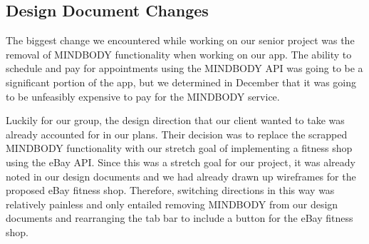 \subsection{Design Document Changes}
The biggest change we encountered while working on our senior project was the removal of MINDBODY functionality when working on our app. The ability to schedule and pay for appointments using the MINDBODY API was going to be a significant portion of the app, but we determined in December that it was going to be unfeasibly expensive to pay for the MINDBODY service.

Luckily for our group, the design direction that our client wanted to take was already accounted for in our plans. Their decision was to replace the scrapped MINDBODY functionality with our stretch goal of implementing a fitness shop using the eBay API. Since this was a stretch goal for our project, it was already noted in our design documents and we had already drawn up wireframes for the proposed eBay fitness shop. Therefore, switching directions in this way was relatively painless and only entailed removing MINDBODY from our design documents and rearranging the tab bar to include a button for the eBay fitness shop.